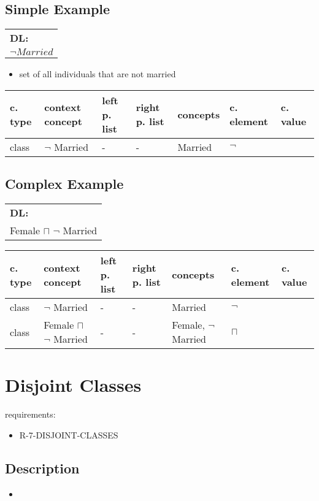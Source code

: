 \documentclass{llncs}
\newenvironment{gcotable}{
  \scriptsize
  \sffamily
  \vspace{0.3cm}
  \begin{tabular}{l|l|l|l|l|l|l}
  \hline
  \textbf{c. type} & \textbf{context concept} & \textbf{left p. list} & \textbf{right p. list} & \textbf{concepts} & \textbf{c. element} & \textbf{c. value} \\
  \hline

}{
  \hline
  \end{tabular}
  \linebreak
}
\newenvironment{DL}{
  \scriptsize
  \sffamily
  \vspace{0.3cm}
  \begin{tabular}{l}
	\textbf{DL:} \\

}{
  \end{tabular}
  \linebreak
}
\begin{document}
\subsection{Simple Example}

\begin{DL}
$ \neg Married $ \\ 
\end{DL}

\begin{itemize}
	\item set of all individuals that are not married
\end{itemize}

\begin{gcotable}
class & $\neg$ Married & - & - & Married & $\neg$ \\
\end{gcotable}

\subsection{Complex Example}

\begin{DL}
Female $\sqcap$ $\neg$ Married \\
\end{DL}

\begin{gcotable}
class & $\neg$ Married & - & - & Married & $\neg$ \\
class & Female $\sqcap$ $\neg$ Married & - & - & Female, $\neg$ Married & $\sqcap$ \\
\end{gcotable}

\section{Disjoint Classes}

requirements:

\begin{itemize}
	\item R-7-DISJOINT-CLASSES
\end{itemize}

\subsection{Description}

\begin{itemize}
	\item 
\end{itemize}
\end{document}
